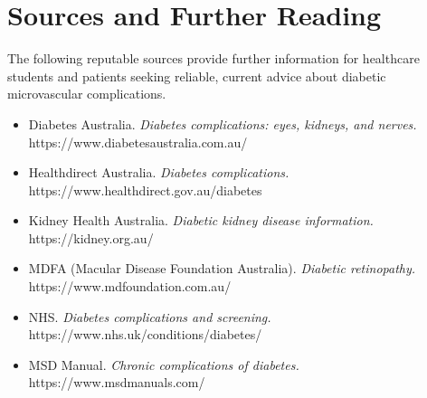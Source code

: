 \section*{Sources and Further Reading}
The following reputable sources provide further information for healthcare students and patients seeking reliable, current advice about diabetic microvascular complications.

\begin{itemize}
    \item Diabetes Australia. \textit{Diabetes complications: eyes, kidneys, and nerves.} https://www.diabetesaustralia.com.au/
    \item Healthdirect Australia. \textit{Diabetes complications.} https://www.healthdirect.gov.au/diabetes
    \item Kidney Health Australia. \textit{Diabetic kidney disease information.} https://kidney.org.au/
    \item MDFA (Macular Disease Foundation Australia). \textit{Diabetic retinopathy.} https://www.mdfoundation.com.au/
    \item NHS. \textit{Diabetes complications and screening.} https://www.nhs.uk/conditions/diabetes/
    \item MSD Manual. \textit{Chronic complications of diabetes.} https://www.msdmanuals.com/
\end{itemize}
